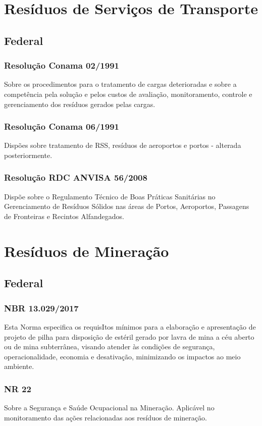 \section{Resíduos de Serviços de Transporte}
\begin{subapend}
	\subsection{Federal}
	\begin{subsubapend}
		\subsubsection{Resolução Conama 02/1991}
		Sobre os procedimentos para o tratamento de cargas deterioradas e sobre a competência pela solução e pelos custos de avaliação, monitoramento, controle e gerenciamento dos resíduos gerados pelas cargas.
		\subsubsection{Resolução Conama 06/1991}
		Dispões sobre tratamento de RSS, resíduos de aeroportos e portos - alterada posteriormente.
		\subsubsection{Resolução RDC ANVISA 56/2008}
		Dispõe sobre o Regulamento Técnico de Boas Práticas Sanitárias no Gerenciamento de Resíduos Sólidos nas áreas de Portos, Aeroportos, Passagens de Fronteiras e Re­cintos Alfandegados.
	\end{subsubapend}
\end{subapend}

\section{Resíduos de Mineração}

\begin{subapend}
	\subsection{Federal}
	\begin{subsubapend}
		\subsubsection{NBR 13.029/2017}
		Esta Norma especifica os requisItos mínimos para a elaboração e apresentação de projeto de pilha para disposição de estéril gerado por lavra de mina a céu aberto ou de mina subterrânea, visando atender às condições de segurança, operacionalidade, economia e desativação, minimizando os impactos ao meio ambiente.
		\subsubsection{NR 22}
		Sobre a Segurança e Saúde Ocupacional na Mineração. Aplicável no monitoramento das ações relacionadas aos resíduos de mineração.
	\end{subsubapend}
\end{subapend}



